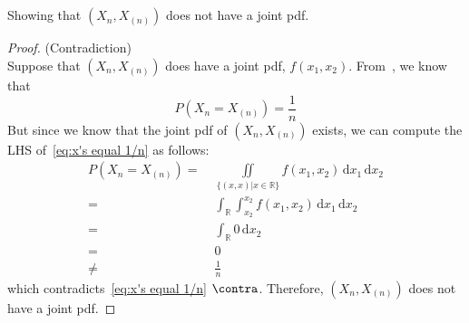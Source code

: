 \documentclass[hwnumber=3,studentnumber=20053722]{mthe353answer}
\begin{document}
\begin{questions}
\begin{parts}
      \part{}
      Showing that \((X_n, X_{(n)})\) does not have a joint pdf.
      \begin{solution}
        \begin{proof}
          (Contradiction)\\
          Suppose that \((X_n, X_{(n)})\) does have a joint pdf, \(f(x_1, x_2)\).
          From~, we know that
          \begin{equation}
            \label{eq:x's equal 1/n}
            P(X_n = X_{(n)}) = \frac{1}{n}
          \end{equation}
          But since we know that the joint pdf of \((X_n, X_{(n)})\) exists, we
          can compute the LHS of~\eqref{eq:x's equal 1/n} as follows:
          \begin{align*}
            P(X_n = X_{(n)}) =&\; \iint\limits_{\{(x, x) | x \in \mathbb{R}\}}
              f(x_1, x_2) \, \textrm{d}x_1 \, \textrm{d}x_2 \\
            =&\; \int_{\mathbb{R}} \int_{x_2}^{x_2} f(x_1, x_2) \, \textrm{d}x_1 \, \textrm{d}x_2\\
            =&\; \int_{\mathbb{R}} 0 \, \textrm{d}x_2\\
            =&\; 0\\
            \neq&\; \frac{1}{n}
          \end{align*}
          which contradicts~\eqref{eq:x's equal 1/n} \(\contra\). Therefore,
          \((X_n, X_{(n)})\) does not have a joint pdf.
        \end{proof}
      \end{solution}
    \end{parts}
  \end{questions}
\end{document}
